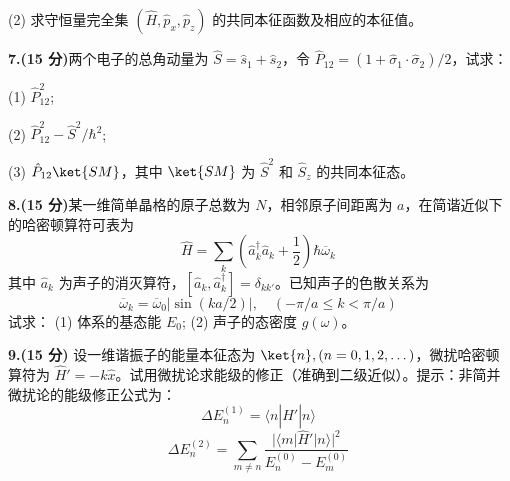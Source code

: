 (2) 求守恒量完全集 $(\hat{H}, \hat{p}_x, \hat{p}_z)$ 的共同本征函数及相应的本征值。

\textbf{7.(15 分)}两个电子的总角动量为 $\hat{S} = \hat{s}_1 + \hat{s}_2$，令 $\hat{P}_{12} = (1 + \hat{\sigma}_1 \cdot \hat{\sigma}_2)/2$，试求：

(1) $\hat{P}_{12}^2$;

(2) $\hat{P}_{12}^2 - \hat{S}^2/\hbar^2$;

(3) $\hat{P}_{12} \ket{SM}$，其中 $\ket{SM}$ 为 $\hat{S}^2$ 和 $\hat{S}_z$ 的共同本征态。

\textbf{8.(15 分)}某一维简单晶格的原子总数为 $N$，相邻原子间距离为 $a$，在简谐近似下的哈密顿算符可表为
$$\hat{H} = \sum_k \left(\hat a_k^\dagger \hat a_k + \frac{1}{2}\right)\hbar \overline{\omega}_k~$$
其中 $\hat a_k$ 为声子的消灭算符，$[\hat a_k, \hat a_k^\dagger] = \delta_{kk'}$。已知声子的色散关系为
$$\overline{\omega}_k = \overline{\omega}_0 |\sin(ka/2)|, \quad (-\pi/a \leq k < \pi/a)~$$
试求：
(1) 体系的基态能 $E_0$;
(2) 声子的态密度 $g(\omega)$。

\textbf{9.(15 分)} 设一维谐振子的能量本征态为 $\ket{n}, (n = 0, 1, 2, \dots)$，微扰哈密顿算符为 $\hat{H}' = -k\hat{x}$。试用微扰论求能级的修正（准确到二级近似）。提示：非简并微扰论的能级修正公式为：
$$\Delta E_n^{(1)} = \langle n | \hat{H}' | n \rangle~$$
$$\Delta E_n^{(2)} = \sum_{m \neq n} \frac{|\langle m | \hat{H}' | n \rangle|^2}{E_n^{(0)} - E_m^{(0)}}~$$